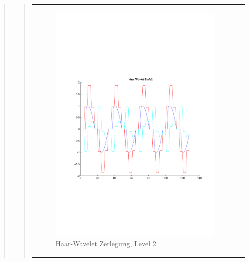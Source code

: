 \begin{quote}
\begin{quote}
       
        \begin{center}
                \begin{tabular}{ll}
    
                \hspace{-12em}
                    \begin{minipage}{0.6\textwidth}
    
                        \begin{figure}[H]
                            \label{fig:}
                            \includegraphics[scale=0.45, trim = 0.8cm 6cm 3cm
                            7.5cm,
                            clip]{./Bilder/Termin8/Haar_Wavlet_lvl_2}
                            \caption{Haar-Wavelet Zerlegung, Level 2}
                        \end{figure}
    

\end{minipage}
\end{tabular}
\end{center}
\end{quote}
\end{quote}
